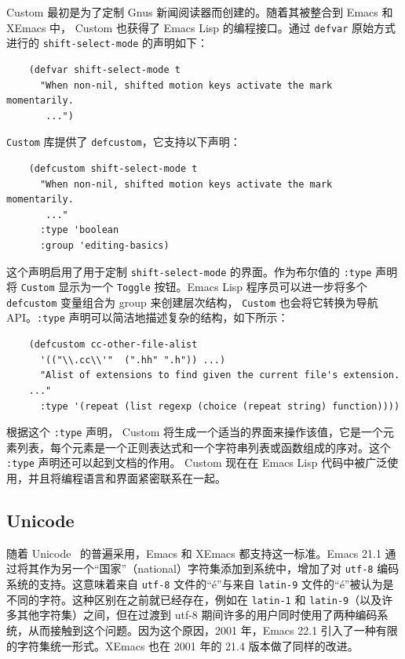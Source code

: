 \documentclass[format=acmsmall,screen]{acmart}
\begin{document}
Custom 最初是为了定制 Gnus 新闻阅读器而创建的。随着其被整合到 Emacs 和 XEmacs 中， Custom 也获得了 Emacs Lisp 的编程接口。通过 \texttt{defvar} 原始方式进行的 \texttt{shift-select-mode} 的声明如下：
%
\begin{verbatim}
    (defvar shift-select-mode t
      "When non-nil, shifted motion keys activate the mark momentarily.
       ...")
\end{verbatim}
%
\texttt{Custom} 库提供了 \texttt{defcustom}，它支持以下声明：
%
\begin{verbatim}
    (defcustom shift-select-mode t
      "When non-nil, shifted motion keys activate the mark momentarily.
       ..."
      :type 'boolean
      :group 'editing-basics)
\end{verbatim}
%
这个声明启用了用于定制 \texttt{shift-select-mode} 的界面。作为布尔值的 \texttt{:type} 声明将 \texttt{Custom} 显示为一个 \texttt{Toggle} 按钮。Emacs Lisp 程序员可以进一步将多个 \texttt{defcustom} 变量组合为 group 来创建层次结构， \texttt{Custom} 也会将它转换为导航 API。\texttt{:type} 声明可以简洁地描述复杂的结构，如下所示：

\begin{verbatim}
    (defcustom cc-other-file-alist
      '(("\\.cc\\'"  (".hh" ".h")) ...)
      "Alist of extensions to find given the current file's extension.
    ..."
      :type '(repeat (list regexp (choice (repeat string) function))))
\end{verbatim}

根据这个 \texttt{:type} 声明， Custom 将生成一个适当的界面来操作该值，它是一个元素列表，每个元素是一个正则表达式和一个字符串列表或函数组成的序对。这个 \texttt{:type} 声明还可以起到文档的作用。 Custom 现在在 Emacs Lisp 代码中被广泛使用，并且将编程语言和界面紧密联系在一起。

\subsection{Unicode}
\label{sec:unicode}

随着 Unicode~\cite{Unicode6} 的普遍采用，Emacs 和 XEmacs 都支持这一标准。Emacs 21.1 通过将其作为另一个“国家”（national）字符集添加到系统中，增加了对 \texttt{utf-8} 编码系统的支持。这意味着来自 \texttt{utf-8} 文件的“é”与来自 \texttt{latin-9} 文件的“é”被认为是不同的字符。这种区别在之前就已经存在，例如在 \texttt{latin-1} 和 \texttt{latin-9}（以及许多其他字符集）之间，但在过渡到 utf-8 期间许多的用户同时使用了两种编码系统，从而接触到这个问题。因为这个原因，2001 年，Emacs 22.1 引入了一种有限的字符集统一形式。XEmacs 也在 2001 年的 21.4 版本做了同样的改进。
\end{document}

